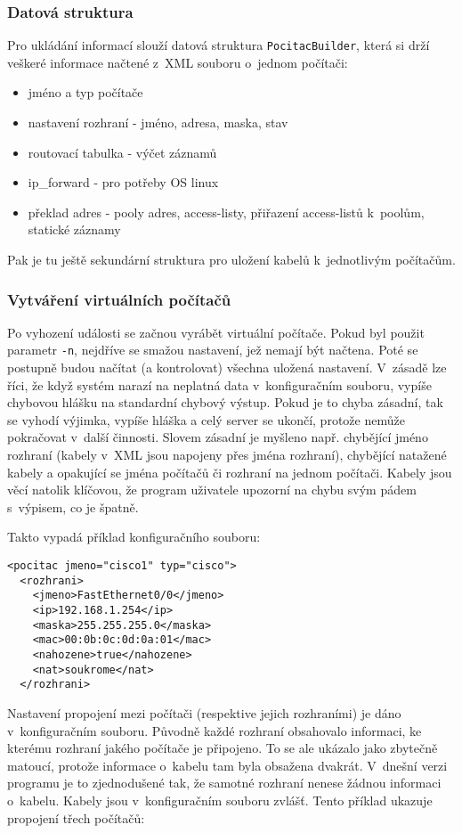 \subsubsection{Datová struktura}
Pro ukládání informací slouží datová struktura \verb|PocitacBuilder|, která si drží veškeré informace načtené z~XML souboru o~jednom počítači:
\begin{itemize}
 \item jméno a typ počítače
 \item nastavení rozhraní - jméno, adresa, maska, stav
 \item routovací tabulka - výčet záznamů
 \item ip\_forward - pro potřeby OS linux
 \item překlad adres - pooly adres, access-listy, přiřazení access-listů k~poolům, statické záznamy
\end{itemize}

Pak je tu ještě sekundární struktura pro uložení kabelů k~jednotlivým počítačům.

\subsubsection{Vytváření virtuálních počítačů}
Po vyhození události  se začnou vyrábět virtuální počítače. Pokud byl použit parametr \verb|-n|, nejdříve se smažou nastavení, jež nemají být načtena. Poté se postupně budou načítat (a kontrolovat) všechna uložená nastavení. V~zásadě lze říci, že když systém narazí na neplatná data v~konfiguračním souboru, vypíše chybovou hlášku na standardní chybový výstup. Pokud je to chyba zásadní, tak se vyhodí výjimka, vypíše hláška a celý server se ukončí, protože nemůže pokračovat v~další činnosti. Slovem zásadní je myšleno např. chybějící jméno rozhraní (kabely v~XML jsou napojeny přes jména rozhraní), chybějící natažené kabely a opakující se jména počítačů či rozhraní na jednom počítači. Kabely jsou věcí natolik klíčovou, že program uživatele upozorní na chybu svým pádem s~výpisem, co je špatně. 

Takto vypadá příklad konfiguračního souboru:
\begin{verbatim}
<pocitac jmeno="cisco1" typ="cisco">
  <rozhrani>
    <jmeno>FastEthernet0/0</jmeno>
    <ip>192.168.1.254</ip>
    <maska>255.255.255.0</maska>
    <mac>00:0b:0c:0d:0a:01</mac>
    <nahozene>true</nahozene>
    <nat>soukrome</nat>
  </rozhrani>
\end{verbatim} 

Nastavení propojení mezi počítači (respektive jejich rozhraními) je dáno v~konfiguračním souboru. Původně každé rozhraní obsahovalo informaci, ke kterému rozhraní jakého počítače je připojeno. To se ale ukázalo jako zbytečně matoucí, protože informace o~kabelu tam byla obsažena dvakrát. V~dnešní verzi programu je to zjednodušené tak, že samotné rozhraní nenese žádnou informaci o~kabelu. Kabely jsou v~konfiguračním souboru zvlášť. Tento příklad ukazuje propojení třech počítačů:

